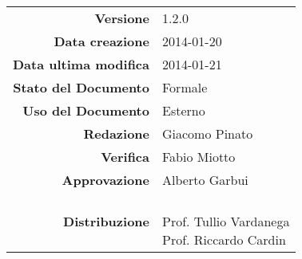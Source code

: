 
\newcommand{\Versione}{1.2.0}						%
\newcommand{\Data}{2014-01-20}						%
\newcommand{\DataUltimaModifica}{2014-01-21}
\newcommand{\TipoDocumento}{Verbale esterno 2014-01-20}		%




\begin{center}
\begin{tabular}{r|l}
\textbf{Versione} & \Versione{} \\
\textbf{Data creazione} & \Data{} \\
\textbf{Data ultima modifica} & \DataUltimaModifica{} \\
\textbf{Stato del Documento} & Formale \\		%
\textbf{Uso del Documento} & Esterno \\			%
\textbf{Redazione} & Giacomo Pinato\\				%
\textbf{Verifica} & Fabio Miotto\\		%
\textbf{Approvazione} & Alberto Garbui \\		%
\textbf{Distribuzione} & \parbox[t]{4cm}{\NomeGruppo{} \\Prof. Tullio Vardanega \\ Prof. Riccardo Cardin \\ \Prop{} }\\
\end{tabular}
\end{center}

\vspace{0.05in}

\begin{abstract}
\begin{center}
Verbale della riunione tra i componenti del gruppo \NomeGruppo{} per il progetto \\ \Progetto{}, avvenuta in data 2014-01-20.
\end{center}
\end{abstract}

